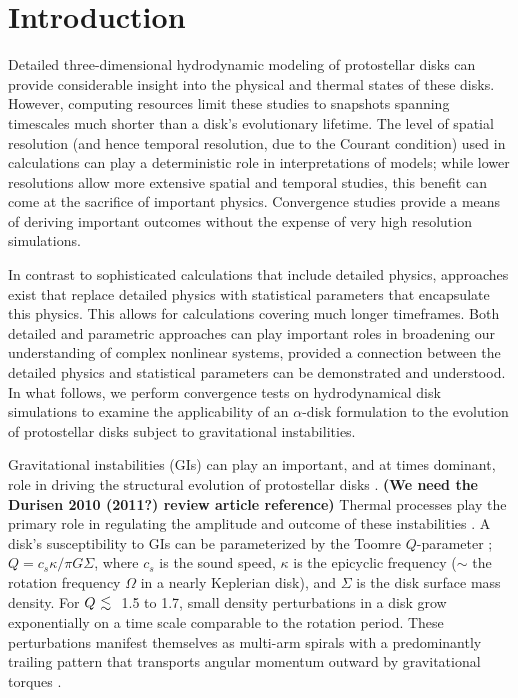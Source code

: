 \documentclass[manuscript]{aastex} %
\newcommand{\al}{\mbox{ \raisebox{-.8ex}{$\stackrel{\textstyle <}{\sim}$} }}
\begin{document}

\section{Introduction}

Detailed three-dimensional hydrodynamic modeling of protostellar disks can provide considerable insight into the physical and thermal states of these disks.  However,  computing resources limit these studies to snapshots spanning timescales much shorter than a disk's evolutionary lifetime. The level of spatial resolution (and hence temporal resolution, due to the Courant condition) used in calculations can play a deterministic role in interpretations of models; while lower resolutions allow more extensive spatial and temporal studies, this benefit can come at the sacrifice of important physics.  Convergence studies provide a means 
of deriving important outcomes without the expense of very high resolution simulations.  

In contrast to sophisticated calculations that include detailed physics, 
approaches exist that replace detailed physics with statistical parameters that encapsulate this physics.  This
allows for calculations covering much longer timeframes.  Both detailed and 
parametric
approaches can play important roles in broadening our understanding of complex nonlinear systems, provided a connection between the detailed physics and statistical parameters can be demonstrated and understood. In what follows, we perform convergence 
tests on hydrodynamical disk simulations to examine the applicability of an $\alpha$-disk 
formulation \citep{shakura1973} to  the
evolution of protostellar disks subject to gravitational instabilities.   


Gravitational instabilities (GIs) can play an important, and at times dominant, role in driving the structural 
evolution of  protostellar disks \citep[for reviews, see][]{durisen2005, durisen2010}. {\bf (We need the Durisen 2010 (2011?)
review article reference)}
Thermal processes play the primary role in regulating the amplitude and outcome of these instabilities \citep{pickett1998,pickett2000,mejia2005,nelson1998,nelson2000a}. A disk's susceptibility to GIs can be parameterized by the Toomre $Q$-parameter \citep{toomre1981};  $Q = c_s \kappa / \pi G \Sigma$, where $c_s$ is the sound speed, $\kappa$ is the epicyclic frequency ($\sim$ the rotation frequency 
$\Omega$ in a nearly Keplerian disk), and $\Sigma$ is the disk surface mass density. For $Q \al$  1.5 to 1.7,  small density perturbations in a disk grow exponentially on a time scale comparable to the rotation period. These perturbations manifest themselves as multi-arm spirals with a predominantly trailing pattern that transports angular momentum outward by gravitational torques \citep{larson1984,boss1984,durisen1986,papaloizou1991, laughlin1994,nelson1998,pickett1998}. 
\end{document}

